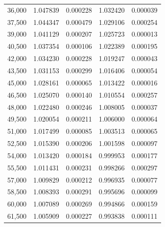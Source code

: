 \begin{longtable}{rrrrr}
36,000 & 1.047839 & 0.000228 & 1.032420 & 0.000039 \\
37,500 & 1.044347 & 0.000479 & 1.029106 & 0.000254 \\
39,000 & 1.041129 & 0.000207 & 1.025723 & 0.000013 \\
40,500 & 1.037354 & 0.000106 & 1.022389 & 0.000195 \\
42,000 & 1.034230 & 0.000228 & 1.019247 & 0.000043 \\
43,500 & 1.031153 & 0.000299 & 1.016406 & 0.000054 \\
45,000 & 1.028161 & 0.000065 & 1.013422 & 0.000016 \\
46,500 & 1.025070 & 0.000140 & 1.010554 & 0.000257 \\
48,000 & 1.022480 & 0.000246 & 1.008005 & 0.000037 \\
49,500 & 1.020054 & 0.000211 & 1.006000 & 0.000064 \\
51,000 & 1.017499 & 0.000085 & 1.003513 & 0.000065 \\
52,500 & 1.015390 & 0.000206 & 1.001598 & 0.000097 \\
54,000 & 1.013420 & 0.000184 & 0.999953 & 0.000177 \\
55,500 & 1.011431 & 0.000231 & 0.998266 & 0.000297 \\
57,000 & 1.009829 & 0.000212 & 0.996935 & 0.000077 \\
58,500 & 1.008393 & 0.000291 & 0.995696 & 0.000099 \\
60,000 & 1.007089 & 0.000269 & 0.994866 & 0.000159 \\
61,500 & 1.005909 & 0.000227 & 0.993838 & 0.000111 \\
\bottomrule
\end{longtable}